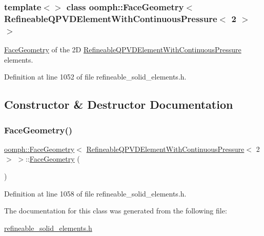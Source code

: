 \subsubsection*{template$<$$>$\newline
class oomph\+::\+Face\+Geometry$<$ Refineable\+Q\+P\+V\+D\+Element\+With\+Continuous\+Pressure$<$ 2 $>$ $>$}

\hyperlink{classoomph_1_1FaceGeometry}{Face\+Geometry} of the 2D \hyperlink{classoomph_1_1RefineableQPVDElementWithContinuousPressure}{Refineable\+Q\+P\+V\+D\+Element\+With\+Continuous\+Pressure} elements. 

Definition at line 1052 of file refineable\+\_\+solid\+\_\+elements.\+h.



\subsection{Constructor \& Destructor Documentation}
\mbox{\label{classoomph_1_1FaceGeometry_3_01RefineableQPVDElementWithContinuousPressure_3_012_01_4_01_4_a2f1ffc750cf598e1aaf58754a1b442e6}} 
\subsubsection{\texorpdfstring{Face\+Geometry()}{FaceGeometry()}}
{\footnotesize\ttfamily \hyperlink{classoomph_1_1FaceGeometry}{oomph\+::\+Face\+Geometry}$<$ \hyperlink{classoomph_1_1RefineableQPVDElementWithContinuousPressure}{Refineable\+Q\+P\+V\+D\+Element\+With\+Continuous\+Pressure}$<$ 2 $>$ $>$\+::\hyperlink{classoomph_1_1FaceGeometry}{Face\+Geometry} (\begin{DoxyParamCaption}{ }\end{DoxyParamCaption})\hspace{0.3cm}{\ttfamily [inline]}}



Definition at line 1058 of file refineable\+\_\+solid\+\_\+elements.\+h.



The documentation for this class was generated from the following file\+:\begin{DoxyCompactItemize}
\item 
\hyperlink{refineable__solid__elements_8h}{refineable\+\_\+solid\+\_\+elements.\+h}\end{DoxyCompactItemize}
